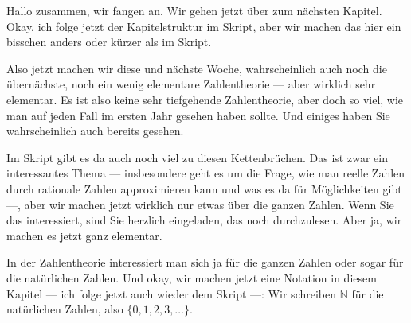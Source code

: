 \begin{spoken-clean}[00:00:00 - 00:01:49]
Hallo zusammen, wir fangen an. Wir gehen jetzt über zum nächsten Kapitel. Okay, ich folge jetzt der Kapitelstruktur im Skript, aber wir machen das hier ein bisschen anders oder kürzer als im Skript.

Also jetzt machen wir diese und nächste Woche, wahrscheinlich auch noch die übernächste, noch ein wenig elementare Zahlentheorie --- aber wirklich sehr elementar. Es ist also keine sehr tiefgehende Zahlentheorie, aber doch so viel, wie man auf jeden Fall im ersten Jahr gesehen haben sollte. Und einiges haben Sie wahrscheinlich auch bereits gesehen.

Im Skript gibt es da auch noch viel zu diesen Kettenbrüchen. Das ist zwar ein interessantes Thema --- insbesondere geht es um die Frage, wie man reelle Zahlen durch rationale Zahlen approximieren kann und was es da für Möglichkeiten gibt ---, aber wir machen jetzt wirklich nur etwas über die ganzen Zahlen. Wenn Sie das interessiert, sind Sie herzlich eingeladen, das noch durchzulesen. Aber ja, wir machen es jetzt ganz elementar.

In der Zahlentheorie interessiert man sich ja für die ganzen Zahlen oder sogar für die natürlichen Zahlen. Und okay, wir machen jetzt eine Notation in diesem Kapitel --- ich folge jetzt auch wieder dem Skript ---: Wir schreiben $\mathbb{N}$ für die natürlichen Zahlen, also $\{0, 1, 2, 3, \dots\}$.
\end{spoken-clean}

\begin{math-stroke}
\end{math-stroke}

